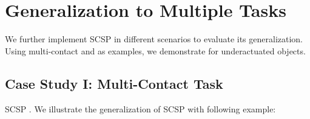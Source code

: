 \begingroup
\setlength{\textfloatsep}{10pt}
\setlength{\floatsep}{8pt}
\raggedbottom
\section{Generalization to Multiple Tasks}\label{sec:generalize}

We further implement SCSP in different scenarios to evaluate its  generalization. Using multi-contact and  as examples, we demonstrate  for underactuated objects.

\subsection{Case Study I: Multi-Contact Task}

SCSP . We illustrate the generalization of SCSP with following example:

